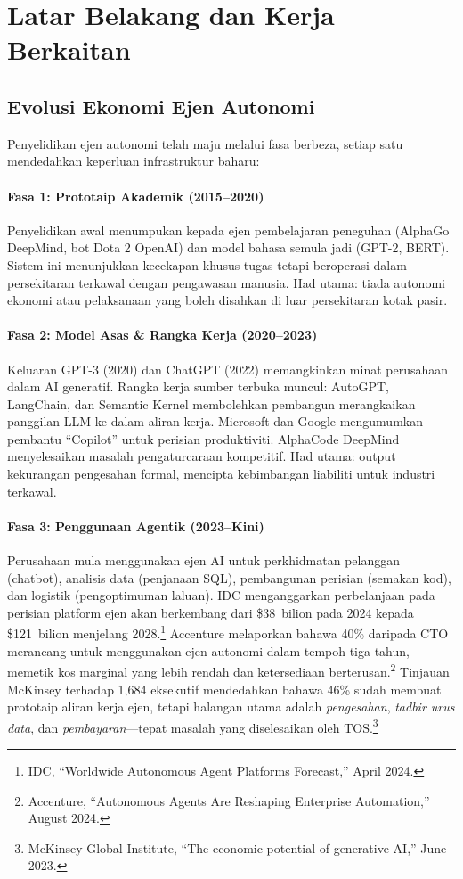 \documentclass[11pt]{article}
\begin{document}
\section{Latar Belakang dan Kerja Berkaitan}
\subsection{Evolusi Ekonomi Ejen Autonomi}
Penyelidikan ejen autonomi telah maju melalui fasa berbeza, setiap satu mendedahkan keperluan infrastruktur baharu:

\paragraph{Fasa 1: Prototaip Akademik (2015--2020)} Penyelidikan awal menumpukan kepada ejen pembelajaran peneguhan (AlphaGo DeepMind, bot Dota 2 OpenAI) dan model bahasa semula jadi (GPT-2, BERT). Sistem ini menunjukkan kecekapan khusus tugas tetapi beroperasi dalam persekitaran terkawal dengan pengawasan manusia. Had utama: tiada autonomi ekonomi atau pelaksanaan yang boleh disahkan di luar persekitaran kotak pasir.

\paragraph{Fasa 2: Model Asas \& Rangka Kerja (2020--2023)} Keluaran GPT-3 (2020) dan ChatGPT (2022) memangkinkan minat perusahaan dalam AI generatif. Rangka kerja sumber terbuka muncul: AutoGPT, LangChain, dan Semantic Kernel membolehkan pembangun merangkaikan panggilan LLM ke dalam aliran kerja. Microsoft dan Google mengumumkan pembantu ``Copilot'' untuk perisian produktiviti. AlphaCode DeepMind menyelesaikan masalah pengaturcaraan kompetitif. Had utama: output kekurangan pengesahan formal, mencipta kebimbangan liabiliti untuk industri terkawal.

\paragraph{Fasa 3: Penggunaan Agentik (2023--Kini)} Perusahaan mula menggunakan ejen AI untuk perkhidmatan pelanggan (chatbot), analisis data (penjanaan SQL), pembangunan perisian (semakan kod), dan logistik (pengoptimuman laluan). IDC menganggarkan perbelanjaan pada perisian platform ejen akan berkembang dari \$38~bilion pada 2024 kepada \$121~bilion menjelang 2028.\footnote{IDC, ``Worldwide Autonomous Agent Platforms Forecast,'' April 2024.} Accenture melaporkan bahawa 40\% daripada CTO merancang untuk menggunakan ejen autonomi dalam tempoh tiga tahun, memetik kos marginal yang lebih rendah dan ketersediaan berterusan.\footnote{Accenture, ``Autonomous Agents Are Reshaping Enterprise Automation,'' August 2024.} Tinjauan McKinsey terhadap 1,684 eksekutif mendedahkan bahawa 46\% sudah membuat prototaip aliran kerja ejen, tetapi halangan utama adalah \emph{pengesahan}, \emph{tadbir urus data}, dan \emph{pembayaran}---tepat masalah yang diselesaikan oleh TOS.\footnote{McKinsey Global Institute, ``The economic potential of generative AI,'' June 2023.}
\end{document}
